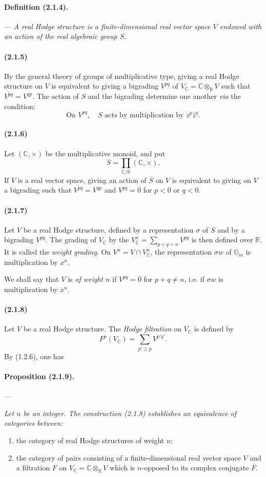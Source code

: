 \documentclass[10pt]{article}
\newcommand{\C}{\mathbb C}
\newcommand{\R}{\mathbb R}
\newcommand{\Gm}{\mathbb G_m}
\begin{document}
\paragraph{Definition (2.1.4).} --- \emph{A real Hodge structure is a finite-dimensional real vector space $V$ endowed with an action of the real algebraic group $S$.}

\paragraph{(2.1.5)} By the general theory of groups of multiplicative type, giving a real Hodge structure on $V$ is equivalent to giving a bigrading $V^{pq}$ of $V_\C=\C\otimes_\R V$ such that $\overline{V^{pq}}=V^{qp}$. The action of $S$ and the bigrading determine one another \emph{via} the condition:
\[
\tag{2.1.5.1}
\text{On }V^{pq},\quad S\text{ acts by multiplication by }z^p\bar z^q.
\]

\paragraph{(2.1.6)} Let $(\C,\times)$ be the multiplicative monoid, and put
\[
\overline S=\prod_{\C/\R}(\C,\times).
\]
If $V$ is a real vector space, giving an action of $\overline S$ on $V$ is equivalent to giving on $V$ a bigrading such that $\overline{V^{pq}}=V^{qp}$ and $V^{pq}=0$ for $p<0$ or $q<0$.

\paragraph{(2.1.7)} Let $V$ be a real Hodge structure, defined by a representation $\sigma$ of $S$ and by a bigrading $V^{pq}$. The grading of $V_\C$ by the $V_\C^n=\sum_{p+q=n}V^{pq}$ is then defined over $\R$. It is called the \emph{weight grading}. On $V^n=V\cap V_\C^n$, the representation $\sigma w$ of $\Gm$ is multiplication by $x^n$.

We shall say that $V$ is \emph{of weight $n$} if $V^{pq}=0$ for $p+q\ne n$, i.e. if $\sigma w$ is multiplication by $x^n$.

\paragraph{(2.1.8)} Let $V$ be a real Hodge structure. The \emph{Hodge filtration} on $V_\C$ is defined by
\[
F^p(V_\C)=\sum_{p'\ge p}V^{p'q'}.
\]
By (1.2.6), one has

\paragraph{Proposition (2.1.9).} --- {\itshape Let $n$ be an integer. The construction (2.1.8) establishes an equivalence of categories between:
\begin{enumerate}[label=\alph*)]
\item the category of real Hodge structures of weight $n$;
\item the category of pairs consisting of a finite-dimensional real vector space $V$ and a filtration $F$ on $V_\C=\C\otimes_\R V$ which is $n$-opposed to its complex conjugate $\overline F$.
\end{enumerate}}
\end{document}
